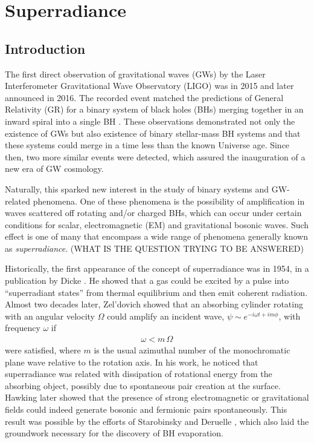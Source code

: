 
\chapter{Superradiance} %
\label{Chapter1}


\section{Introduction}

The first direct observation of gravitational waves (GWs) by the Laser Interferometer Gravitational Wave Observatory (LIGO) was in 2015 and later announced in 2016.
The recorded event matched the predictions of General Relativity (GR) for a binary system of black holes (BHs) merging together in an inward spiral into a single BH \cite{Abbott2016}.
These observations demonstrated not only the existence of GWs but also existence of binary stellar-mass BH systems and that these systems could merge in a time less than the known Universe age.
Since then, two more similar events were detected, which assured the inauguration of a new era of GW cosmology. 

Naturally, this sparked new interest in the study of binary systems and GW-related phenomena.
One of these phenomena is the possibility of amplification in waves scattered off rotating and/or charged BHs, which can occur under certain conditions for scalar, electromagnetic (EM) and gravitational bosonic waves.
Such effect is one of many that encompass a wide range of phenomena generally known as \emph{superradiance}.
(WHAT IS THE QUESTION TRYING TO BE ANSWERED)

Historically, the first appearance of the concept of superradiance was in 1954, in a publication by Dicke \cite{Dicke1954}.
He showed that a gas could be excited by a pulse into ``superradiant states'' from thermal equilibrium and then emit coherent radiation.
Almost two decades later, Zel'dovich \cite{Zeldovich1971,Zeldovich1972} showed that an absorbing cylinder rotating with an angular velocity $\Omega$ could amplify an incident wave, $\psi \sim e^{-i \omega t + i m \phi}$, with frequency $\omega$ if
\begin{align}
    \omega < m\, \Omega
    \label{eq1:superradiance}
\end{align}
were satisfied, where $m$ is the usual azimuthal number of the monochromatic plane wave relative to the rotation axis.
In his work, he noticed that superradiance was related with dissipation of rotational energy from the absorbing object, possibly due to spontaneous pair creation at the surface. 
Hawking later showed that the presence of strong electromagnetic or gravitational fields could indeed generate bosonic and fermionic pairs spontaneously.
This result was possible by the efforts of Starobinsky and Deruelle \cite{Starobinsky1973a,Starobinsky1973b,Deruelle1974,Deruelle1975}, which also laid the groundwork necessary for the discovery of BH evaporation.

